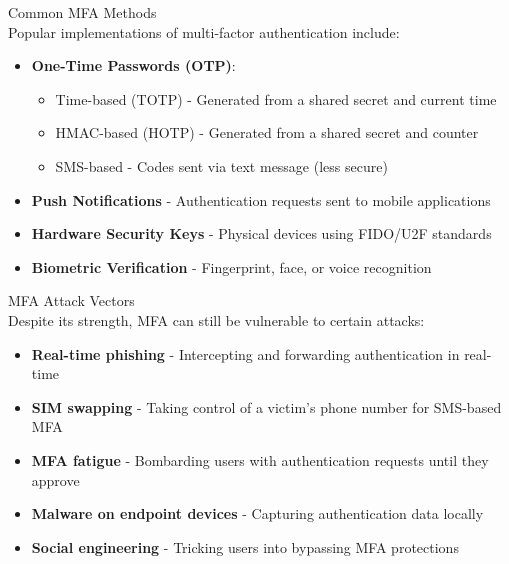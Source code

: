 \begin{concept}{Common MFA Methods}\\
Popular implementations of multi-factor authentication include:
\begin{itemize}
    \item \textbf{One-Time Passwords (OTP)}:
    \begin{itemize}
        \item Time-based (TOTP) - Generated from a shared secret and current time
        \item HMAC-based (HOTP) - Generated from a shared secret and counter
        \item SMS-based - Codes sent via text message (less secure)
    \end{itemize}
    \item \textbf{Push Notifications} - Authentication requests sent to mobile applications
    \item \textbf{Hardware Security Keys} - Physical devices using FIDO/U2F standards
    \item \textbf{Biometric Verification} - Fingerprint, face, or voice recognition
\end{itemize}
\end{concept}

\begin{theorem}{MFA Attack Vectors}\\
Despite its strength, MFA can still be vulnerable to certain attacks:
\begin{itemize}
    \item \textbf{Real-time phishing} - Intercepting and forwarding authentication in real-time
    \item \textbf{SIM swapping} - Taking control of a victim's phone number for SMS-based MFA
    \item \textbf{MFA fatigue} - Bombarding users with authentication requests until they approve
    \item \textbf{Malware on endpoint devices} - Capturing authentication data locally
    \item \textbf{Social engineering} - Tricking users into bypassing MFA protections
\end{itemize}
\end{theorem}

